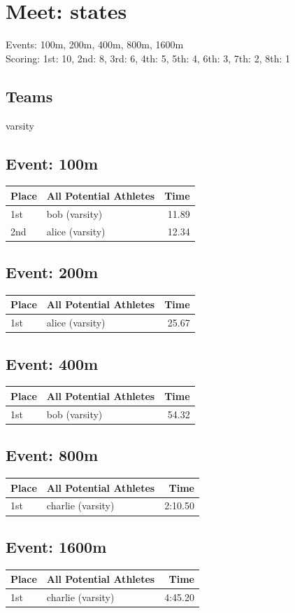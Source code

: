 \documentclass[11pt]{article}
\begin{document}
\section*{Meet: states}

Events: 100m, 200m, 400m, 800m, 1600m\\

Scoring: 1st: 10, 2nd: 8, 3rd: 6, 4th: 5, 5th: 4, 6th: 3, 7th: 2, 8th: 1\\

\subsection*{Teams}
varsity

\subsection*{Event: 100m}
\begin{tabularx}{\linewidth}{lXr}
\toprule
Place & All Potential Athletes & Time \\
\midrule
1st & bob (varsity) & 11.89 \\
2nd & alice (varsity) & 12.34 \\
\bottomrule
\end{tabularx}

\subsection*{Event: 200m}
\begin{tabularx}{\linewidth}{lXr}
\toprule
Place & All Potential Athletes & Time \\
\midrule
1st & alice (varsity) & 25.67 \\
\bottomrule
\end{tabularx}

\subsection*{Event: 400m}
\begin{tabularx}{\linewidth}{lXr}
\toprule
Place & All Potential Athletes & Time \\
\midrule
1st & bob (varsity) & 54.32 \\
\bottomrule
\end{tabularx}

\subsection*{Event: 800m}
\begin{tabularx}{\linewidth}{lXr}
\toprule
Place & All Potential Athletes & Time \\
\midrule
1st & charlie (varsity) & 2:10.50 \\
\bottomrule
\end{tabularx}

\subsection*{Event: 1600m}
\begin{tabularx}{\linewidth}{lXr}
\toprule
Place & All Potential Athletes & Time \\
\midrule
1st & charlie (varsity) & 4:45.20 \\
\bottomrule
\end{tabularx}
\end{document}
